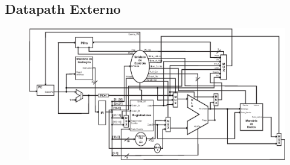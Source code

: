 \documentclass{report}
\begin{document}
	\begin{landscape}
	\section{Datapath Externo}
	\begin{figure}[htpb!]
    	\includegraphics{./datapath/datapath_final-1.eps}
  	\end{figure}
  	\end{landscape}

% 
% 
\end{document}

